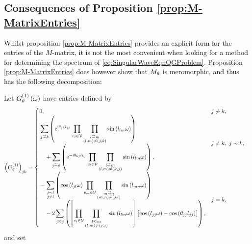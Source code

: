 \subsection{Consequences of Proposition \ref{prop:M-MatrixEntries}} \label{ssec:MMatrixConsequences}
Whilst proposition \ref{prop:M-MatrixEntries} provides an explicit form for the entries of the $M$-matrix,  it is not the most convenient when looking for a method for determining the spectrum of \eqref{eq:SingularWaveEqnQGProblem}.
Proposition \ref{prop:M-MatrixEntries} does however show that $M_\theta$ is meromorphic, and thus has the following decomposition:
\begin{cory} \label{cory:M-MatrixEntriesNoPoles}
	Let $G^{(1)}_\theta\left( \omega \right)$ have entries defined by
	\begin{align*}
		\bracs{G^{(1)}_\qm}_{jk} &= 
		\begin{cases}
			\!\begin{aligned}
				&0,
			\end{aligned}			
			& j \not\con k, \\
			\!\begin{aligned}
				&\sum_{j\conLeft k} \bracs{ \e^{\rmi\qm_{jk}l_{jk}} \prod_{v_l\in\vertSet}\prod_{\substack{ l\conLeft m \\ \bracs{l,m} \neq \bracs{j,k} }}\sin\bracs{l_{lm}\omega} }
				\\ &\quad + \sum_{j\conRight k} \bracs{ \e^{-\rmi\qm_{kj}l_{kj}} \prod_{v_l\in\vertSet}\prod_{\substack{l\conLeft m \\ \bracs{l,m} \neq \bracs{k,j} }}\sin\bracs{l_{lm}\omega} },
			\end{aligned}
			& j\neq k, \ j\con k, \\
			\!\begin{aligned}
				&- \sum_{\substack{j\con l \\ j\neq l}} \bracs{ \cos\bracs{l_{jl}\omega}\prod_{v_m\in\vertSet}\prod_{\substack{ m\conLeft n \\ \bracs{m,n}\neq\bracs{j,l} }}\sin\bracs{l_{mn}\omega} }
				\\ &\quad - 2\sum_{j\conLeft j} \bracs{ \sqbracs{ \prod_{v_l\in\vertSet}\prod_{\substack{l\conLeft m \\ \bracs{l,m}\neq\bracs{j,j} }}\sin\bracs{l_{lm}\omega} }\bigl[ \cos\bracs{l_{jj}\omega} - \cos\bracs{\qm_{jj}l_{jj}} \bigr] },
			\end{aligned}
			& j=k,
		\end{cases}
	\end{align*}
	and set
	\begin{align*}

\end{align*}
\end{cory}
